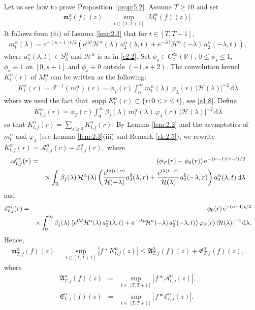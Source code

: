 \documentclass[11pt]{amsproc}
\newcommand{\R}{\mathbb{R}}
\newcommand{\e}{\mathrm{e}}
\newcommand{\supp}{\mathop{\mathrm{supp}}}
\newcommand{\fm}{\mathfrak{m}}
\newcommand{\0}{\mathbf{0}}
\newcommand{\CK}{\mathscr{A}}
\newcommand{\CE}{\mathscr{E}}
\newcommand{\bc}{{ \mathcal{H} }}
\newcommand{\F}{\mathscr{F}}
\newcommand{\fe}{\mathfrak{E}}
\renewcommand{\i}{\mathrm{i}}
\renewcommand{\d}{\mathrm{d}}
\numberwithin{equation}{section}
\numberwithin{figure}{section}
\theoremstyle{definition}
\theoremstyle{remark}
\numberwithin{thm}{section}
\begin{document}
Let us see how to prove Proposition~\ref{prop:5.2}. 
Assume $T\geq 10$ and set
\begin{eqnarray*}
\fm^\alpha_T(f)(z)=\sup_{t\in[T,T+1]}|M^\alpha_t(f)(z)|.
\end{eqnarray*}
It follows from  (iii) of Lemma \ref{lem:2.3} that  for $t\in[T,T+1]$,
\begin{eqnarray*}
m^\alpha_t(\lambda)=\e^{-(n-1)t/2}\left(\e^{\i\lambda t}\bc^\alpha(\lambda)\,a^\alpha_2(\lambda,t)+\e^{-\i\lambda t}\bc^\alpha(-\lambda)\,a^\alpha_2(-\lambda,t)\right),
\end{eqnarray*}
where $a^\alpha_2(\lambda,t)\in S^0_\lambda$ and $\bc^\alpha$ is as in \eqref{e2.2}. Set $\phi_s\in C^\infty_c(\R)$, $0\leq \phi_s\leq 1$, $\phi_s\equiv 1$ on $[0,s+1]$ and $\phi_s\equiv 0$ outside $(-1,s+2)$.
The     convolution kernel $K^\alpha_t(r)$ of $M^\alpha_t$    can be written as the following:
\begin{eqnarray*}
K^\alpha_t(r) = \F^{-1}(m^\alpha_t)(r)
=\phi_T(r)\int_0^\infty m^\alpha_t(\lambda)\,\varphi_\lambda(r)\,|\bc(\lambda)|^{-2}\,\d \lambda 
\end{eqnarray*}
where we used the fact that   $\supp K^\alpha_t(r)\subset \{r:0\leq r\leq t\}$, see \eqref{e1.8}. Define
\begin{eqnarray}\label{ekkk}
K^\alpha_{t,j}(r) = \phi_T(r)\int_0^\infty \beta_j(\lambda)\, m^\alpha_t(\lambda)\,\varphi_\lambda(r)\,|\bc(\lambda)|^{-2}\,\d \lambda 
\end{eqnarray}
so that  $ K^\alpha_{t,j}(r) =\sum\limits_{j\geq 0} K^\alpha_{t,j}(r)$.  
By Lemma \ref{lem:2.2}
and the asymptotics of $m^\alpha_t$ and $\varphi_\lambda$ (see Lemma \ref{lem:2.3}(iii) and Remark \ref{rk:2.5}), we rewrite $  K^\alpha_{t,j}(r) = \CK^\alpha_{t,j}(r) +\CE^\alpha_{t,j}(r),
$
where
\begin{eqnarray}\label{e4.200}
\CK^\alpha_{t,j}(r)&=&
(\phi_T(r)-\phi_0(r))\,\e^{-(n-1)(r+t)/2} \notag \\
&& \times \int_\R\beta_j(\lambda)\,\bc^\alpha(\lambda)\left({\e^{\i\lambda(t+ r)}\over \bc(-\lambda)}a_2^0(\lambda,r)+{\e^{\i\lambda(t-r)}\over \bc(\lambda)}a_2^0(-\lambda,r)\right)a_2^\alpha(\lambda,t)\,\d \lambda
\end{eqnarray}
and
\begin{eqnarray}\label{e4.201}
\CE^\alpha_{t,j}(r)&=&
\phi_0(r)\,\e^{-(n-1)t/2}  \notag\\
&&\times\int_0^\infty \beta_j(\lambda)\left( \e^{\i\lambda t}\bc^\alpha(\lambda)\,a^\alpha_2(\lambda,t)+\e^{-\i\lambda t}\bc^\alpha(-\lambda)\,a^\alpha_2(-\lambda,t)\right)\varphi_\lambda(r)\,|\bc(\lambda)|^{-2}\,\d \lambda.
\end{eqnarray}
Hence,
\begin{eqnarray*}
\fm^\alpha_{T,j}(f)(z)=\sup_{t\in[T,T+1]}|f*K^\alpha_{t,j}(z)|\leq {\mathfrak A}^\alpha_{T,j}(f)(z)
+\fe^\alpha_{T,j}(f)(z),
\end{eqnarray*}
where
\begin{eqnarray*}
{\mathfrak A}^\alpha_{T,j}(f)(z)&=&\sup_{t\in[T,T+1]}|f*\CK^\alpha_{t,j}(z)|,\\
\fe^\alpha_{T,j}(f)(z)&=&\sup_{t\in[T,T+1]}|f*\CE^\alpha_{t,j}(z)|.
\end{eqnarray*}
\end{document}
